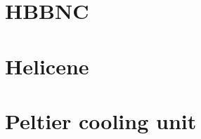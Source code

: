 \documentclass[
twoside,				%
BCOR=12mm,				%
headings=normal,		%
headsepline,			%
footsepline,			%
plainfootsepline,		%
]{scrbook}
\begin{document}
\section{HBBNC}
 
 \section{Helicene}
  
\section{Peltier cooling unit}
 

\printbibliography
\end{document}
